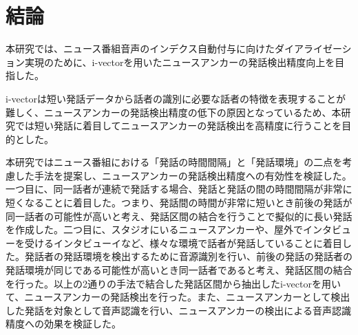 \chapter{結論}
本研究では、ニュース番組音声のインデクス自動付与に向けたダイアライゼーション実現のために、i-vectorを用いたニュースアンカーの発話検出精度向上を目指した。\par

i-vectorは短い発話データから話者の識別に必要な話者の特徴を表現することが難しく、ニュースアンカーの発話検出精度の低下の原因となっているため、本研究では短い発話に着目してニュースアンカーの発話検出を高精度に行うことを目的とした。\par

本研究ではニュース番組における「発話の時間間隔」と「発話環境」の二点を考慮した手法を提案し、ニュースアンカーの発話検出精度への有効性を検証した。一つ目に、同一話者が連続で発話する場合、発話と発話の間の時間間隔が非常に短くなることに着目した。つまり、発話間の時間が非常に短いとき前後の発話が同一話者の可能性が高いと考え、発話区間の結合を行うことで擬似的に長い発話を作成した。二つ目に、スタジオにいるニュースアンカーや、屋外でインタビューを受けるインタビューイなど、様々な環境で話者が発話していることに着目した。発話者の発話環境を検出するために音源識別を行い、前後の発話の発話者の発話環境が同じである可能性が高いとき同一話者であると考え、発話区間の結合を行った。以上の2通りの手法で結合した発話区間から抽出したi-vectorを用いて、ニュースアンカーの発話検出を行った。また、ニュースアンカーとして検出した発話を対象として音声認識を行い、ニュースアンカーの検出による音声認識精度への効果を検証した。\par

\begin{comment}
ニュースアンカーの検出精度の評価指標であるF値を従来手法と比較したところ、発話の時間間隔を考慮した手法が6.5\%、発話環境を考慮した手法が2.3\%の検出精度向上が確認された。また、両方の手法を組み合わせて実験を行ったところ、従来手法と比較して4.7\%の検出精度の向上が確認されたが、発話の時間間隔のみを考慮した場合と比較すると精度が1.8\%低下した。またいずれの手法も、ニュースアンカーの発話数が少ないニュース番組の発話検出精度のP値がニュースアンカーの発話数が多いニュース番組と比較して、10\%程度低下した。\par
\end{comment}

